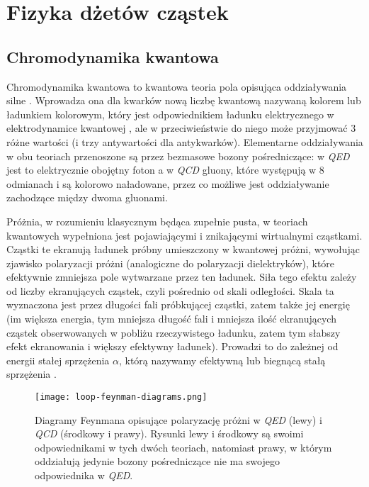 \section{Fizyka dżetów cząstek}


\subsection{Chromodynamika kwantowa}

Chromodynamika kwantowa  to kwantowa teoria pola opisująca oddziaływania silne \cite{perkins_2005}. Wprowadza ona dla kwarków nową liczbę kwantową nazywaną kolorem lub ładunkiem kolorowym, który jest odpowiednikiem ładunku elektrycznego w elektrodynamice kwantowej , ale w przeciwieństwie do niego może przyjmować 3 różne wartości (i trzy antywartości dla antykwarków). Elementarne oddziaływania w obu teoriach przenoszone są przez bezmasowe bozony pośredniczące: w \textit{QED} jest to elektrycznie obojętny foton a w \textit{QCD} gluony, które występują w 8 odmianach i są kolorowo naładowane, przez co możliwe jest oddziaływanie zachodzące między dwoma gluonami.

Próżnia, w rozumieniu klasycznym będąca zupełnie pusta, w teoriach kwantowych wypełniona jest pojawiającymi i znikającymi wirtualnymi cząstkami. Cząstki te ekranują ładunek próbny umieszczony w kwantowej próżni, wywołując zjawisko polaryzacji próżni (analogiczne do polaryzacji dielektryków), które efektywnie zmniejsza pole wytwarzane przez ten ładunek. 
Siła tego efektu zależy od liczby ekranujących cząstek, czyli pośrednio od skali odległości. Skala ta wyznaczona jest przez długości fali próbkującej cząstki, zatem także jej energię (im większa energia, tym mniejsza długość fali i mniejsza ilość ekranujących cząstek obserwowanych w pobliżu rzeczywistego ładunku, zatem tym słabszy efekt ekranowania i większy efektywny ładunek). Prowadzi to do zależnej od energii stałej sprzężenia $\alpha$, którą nazywamy  efektywną lub biegnącą stałą sprzężenia . 


\begin{figure}[h]
	\centering
	\texttt{[image: loop-feynman-diagrams.png]}
	\caption{Diagramy Feynmana opisujące polaryzację próżni w \textit{QED} (lewy) i \textit{QCD} (środkowy i prawy). Rysunki lewy i środkowy są swoimi odpowiednikami w tych dwóch teoriach, natomiast prawy, w którym oddziałują jedynie bozony pośredniczące nie ma swojego odpowiednika w \textit{QED}. }
	\label{fig:feynman-diagrams}
\end{figure}

